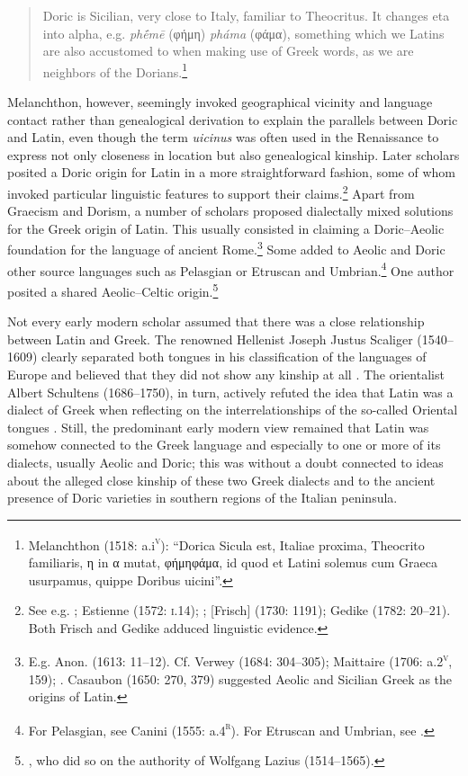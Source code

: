 \begin{quote}
Doric is Sicilian, very close to Italy, familiar to Theocritus. It changes eta into alpha, e.g. \textit{phḗmē} (φήμη) \textit{pháma} (φάμα), something which we Latins are also accustomed to when making use of Greek words, as we are neighbors of the Dorians.\footnote{Melanchthon (1518: a.i\textsc{\textsuperscript{v}}): “Dorica Sicula est, Italiae proxima, Theocrito familiaris, η in α mutat, φήμηφάμα, id quod et Latini solemus cum Graeca usurpamus, quippe Doribus uicini”.}
\end{quote}

Melanchthon, however, seemingly invoked geographical vicinity and language contact rather than genealogical derivation to explain the parallels between Doric and Latin, even though the term \textit{uicinus} was often used in the Renaissance to express not only closeness in location but also genealogical kinship. Later scholars posited a Doric origin for Latin in a more straightforward fashion, some of whom invoked particular linguistic features to support their claims.\footnote{See e.g. \citet[10]{Sylvius1531}; Estienne (1572: \textsc{i.}14); \citet[208]{Merula1605}; [Frisch] (1730: 1191); Gedike (1782: 20–21). Both Frisch and Gedike adduced linguistic evidence.} Apart from Graecism and Dorism, a number of scholars proposed dialectally mixed solutions for the Greek origin of Latin. This usually consisted in claiming a Doric–Aeolic foundation for the language of ancient Rome.\footnote{E.g. Anon. (1613: 11–12). Cf. Verwey (1684: 304–305); Maittaire (1706: a.2\textsc{\textsuperscript{v}}, 159); \citet[161]{Gesner1774}. Casaubon (1650: 270, 379) suggested Aeolic and Sicilian Greek as the origins of Latin.} Some added to Aeolic and Doric other source languages such as Pelasgian or Etruscan and Umbrian.\footnote{For Pelasgian, see Canini (1555: a.4\textsc{\textsuperscript{r}}). For Etruscan and Umbrian, see \citet[39]{Rüdiger1782}.} One author posited a shared Aeolic–Celtic origin.\footnote{\citet[13]{Nicolson1715}, who did so on the authority of Wolfgang Lazius (1514–1565).}

Not every early modern scholar assumed that there was a close relationship between Latin and Greek. The renowned Hellenist Joseph Justus Scaliger (1540–1609) clearly separated both tongues in his classification of the languages of Europe and believed that they did not show any kinship at all \citep{Scaliger1610}. The orientalist Albert Schultens (1686–1750), in turn, actively refuted the idea that Latin was a dialect of Greek when reflecting on the interrelationships of the so-called Oriental tongues \citep[109]{Schultens1738b}. Still, the predominant early modern view remained that Latin was somehow connected to the Greek language and especially to one or more of its dialects, usually Aeolic and Doric; this was without a doubt connected to ideas about the alleged close kinship of these two Greek dialects and to the ancient presence of Doric varieties in southern regions of the Italian peninsula.

